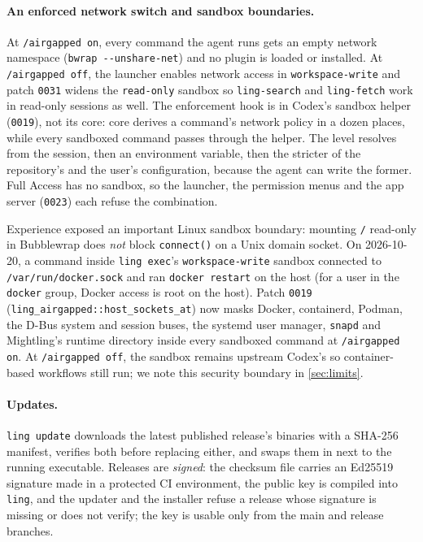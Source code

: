 \documentclass[11pt]{article}
\newcommand{\code}[1]{\texttt{#1}}
\begin{document}
\paragraph{An enforced network switch and sandbox boundaries.} At \code{/airgapped on}, every
command the agent runs gets an empty network namespace (\code{bwrap -{}-unshare-net}) and no plugin
is loaded or installed. At \code{/airgapped off}, the launcher enables network access in
\code{workspace-write} and patch \code{0031} widens the \code{read-only} sandbox so
\code{ling-search} and \code{ling-fetch} work in read-only sessions as well. The enforcement hook is
in Codex's sandbox helper (\code{0019}), not its core: core derives a command's network policy in a
dozen places, while every sandboxed command passes through the helper. The level resolves from the
session, then an environment variable, then the stricter of the repository's and the user's
configuration, because the agent can write the former. Full Access has no sandbox, so the launcher,
the permission menus and the app server (\code{0023}) each refuse the combination.

Experience exposed an important Linux sandbox boundary: mounting \code{/} read-only in Bubblewrap
does \emph{not} block \code{connect()} on a Unix domain socket. On 2026-10-20, a command inside
\code{ling exec}'s \code{workspace-write} sandbox connected to \code{/var/run/docker.sock} and ran
\code{docker restart} on the host (for a user in the \code{docker} group, Docker access is root on
the host). Patch \code{0019} (\code{ling\_airgapped::host\_sockets\_at}) now masks Docker,
containerd, Podman, the D-Bus system and session buses, the systemd user manager, \code{snapd} and
Mightling's runtime directory inside every sandboxed command at \code{/airgapped on}. At
\code{/airgapped off}, the sandbox remains upstream Codex's so container-based workflows still run;
we note this security boundary in \cref{sec:limits}.

\paragraph{Updates.} \code{ling update} downloads the latest published release's binaries with a
SHA-256 manifest, verifies both before replacing either, and swaps them in next to the running
executable. Releases are \emph{signed}: the checksum file carries an Ed25519 signature made in a
protected CI environment, the public key is compiled into \code{ling}, and the updater and the
installer refuse a release whose signature is missing or does not verify; the key is usable only
from the main and release branches.
\end{document}
